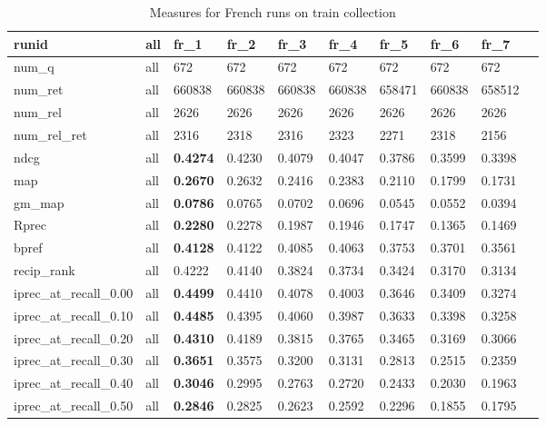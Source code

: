 \begin{table}[tbp]
\caption{Measures for French runs on train collection}
  \label{tab:all-measures-french}
    \centering
    \begin{tabular}{|l|l|l|l|l|l|l|l|l|l|}
    	\toprule
        runid & all & fr\_1 & fr\_2 & fr\_3 & fr\_4 & fr\_5 & fr\_6 & fr\_7  \\
	\midrule
        num\_q & all & 672 & 672 & 672 & 672 & 672 & 672 & 672  \\ 
        num\_ret & all & 660838 & 660838 & 660838 & 660838 & 658471 & 660838 & 658512  \\ 
        num\_rel & all & 2626 & 2626 & 2626 & 2626 & 2626 & 2626 & 2626  \\ 
        num\_rel\_ret & all & 2316 & 2318 & 2316 & 2323 & 2271 & 2318 & 2156  \\ \midrule
	ndcg & all & \textbf{0.4274} & 0.4230 & 0.4079 & 0.4047 & 0.3786 & 0.3599 & 0.3398  \\ \midrule
        map & all & \textbf{0.2670} & 0.2632 & 0.2416 & 0.2383 & 0.2110 & 0.1799 & 0.1731  \\ 
        gm\_map & all & \textbf{0.0786} & 0.0765 & 0.0702 & 0.0696 & 0.0545 & 0.0552 & 0.0394  \\ \midrule
        Rprec & all & \textbf{0.2280} & 0.2278 & 0.1987 & 0.1946 & 0.1747 & 0.1365 & 0.1469  \\ 
        bpref & all & \textbf{0.4128} & 0.4122 & 0.4085 & 0.4063 & 0.3753 & 0.3701 & 0.3561  \\ 
        recip\_rank & all & 0.4222 & 0.4140 & 0.3824 & 0.3734 & 0.3424 & 0.3170 & 0.3134  \\ \midrule
        iprec\_at\_recall\_0.00 & all & \textbf{0.4499} & 0.4410 & 0.4078 & 0.4003 & 0.3646 & 0.3409 & 0.3274  \\ 
        iprec\_at\_recall\_0.10 & all & \textbf{0.4485} & 0.4395 & 0.4060 & 0.3987 & 0.3633 & 0.3398 & 0.3258  \\ 
        iprec\_at\_recall\_0.20 & all & \textbf{0.4310} & 0.4189 & 0.3815 & 0.3765 & 0.3465 & 0.3169 & 0.3066  \\ 
        iprec\_at\_recall\_0.30 & all & \textbf{0.3651} & 0.3575 & 0.3200 & 0.3131 & 0.2813 & 0.2515 & 0.2359  \\ 
        iprec\_at\_recall\_0.40 & all & \textbf{0.3046} & 0.2995 & 0.2763 & 0.2720 & 0.2433 & 0.2030 & 0.1963  \\ 
        iprec\_at\_recall\_0.50 & all & \textbf{0.2846} & 0.2825 & 0.2623 & 0.2592 & 0.2296 & 0.1855 & 0.1795  \\ 

\end{tabular}
\end{table}
